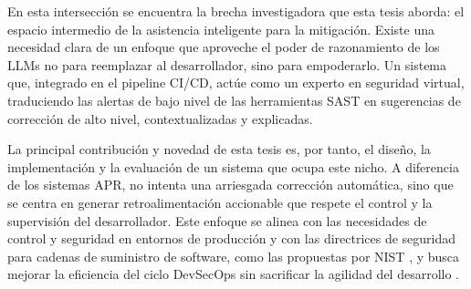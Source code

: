 En esta intersección se encuentra la brecha investigadora que esta tesis aborda: el espacio intermedio de la asistencia inteligente para la mitigación. Existe una necesidad clara de un enfoque que aproveche el poder de razonamiento de los LLMs no para reemplazar al desarrollador, sino para empoderarlo. Un sistema que, integrado en el pipeline CI/CD, actúe como un experto en seguridad virtual, traduciendo las alertas de bajo nivel de las herramientas SAST en sugerencias de corrección de alto nivel, contextualizadas y explicadas.

La principal contribución y novedad de esta tesis es, por tanto, el diseño, la implementación y la evaluación de un sistema que ocupa este nicho. A diferencia de los sistemas APR, no intenta una arriesgada corrección automática, sino que se centra en generar retroalimentación accionable que respete el control y la supervisión del desarrollador. Este enfoque se alinea con las necesidades de control y seguridad en entornos de producción y con las directrices de seguridad para cadenas de suministro de software, como las propuestas por NIST \cite{NIST2024CICDSecurity}, y busca mejorar la eficiencia del ciclo DevSecOps sin sacrificar la agilidad del desarrollo \cite{Laukkanen2017BenefitsChallengesCICD, Myrbakken2019DevSecOpsSLR}.